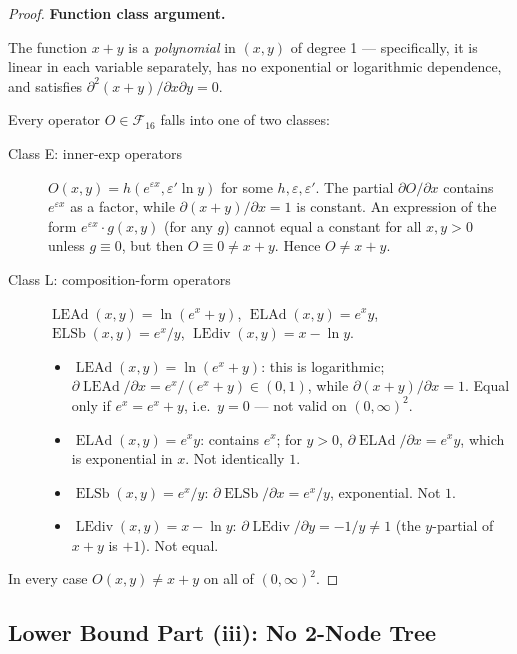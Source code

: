 \documentclass[12pt,a4paper]{article}
\theoremstyle{definition}
\newcommand{\ELAd}{\operatorname{ELAd}}
\newcommand{\ELSb}{\operatorname{ELSb}}
\newcommand{\LEAd}{\operatorname{LEAd}}
\newcommand{\LEdiv}{\operatorname{LEdiv}}
\newcommand{\F}{\mathcal{F}_{16}}
\begin{document}
\begin{proof}
\noindent\textbf{Function class argument.}

The function $x+y$ is a \emph{polynomial} in $(x,y)$ of degree 1 --- specifically, it
is linear in each variable separately, has no exponential or logarithmic dependence,
and satisfies $\partial^2(x+y)/\partial x\partial y = 0$.

Every operator $O\in\F$ falls into one of two classes:
\begin{description}
  \item[Class E: inner-exp operators]
        $O(x,y) = h(e^{\varepsilon x}, \varepsilon'\ln y)$ for some $h, \varepsilon, \varepsilon'$.
        The partial $\partial O/\partial x$ contains $e^{\varepsilon x}$ as a factor,
        while $\partial(x+y)/\partial x = 1$ is constant.
        An expression of the form $e^{\varepsilon x}\cdot g(x,y)$ (for any $g$) cannot
        equal a constant for all $x,y>0$ unless $g\equiv 0$,
        but then $O\equiv 0\neq x+y$.
        Hence $O\neq x+y$.

  \item[Class L: composition-form operators]
        $\LEAd(x,y)=\ln(e^x+y)$, $\ELAd(x,y)=e^x y$, $\ELSb(x,y)=e^x/y$,
        $\LEdiv(x,y)=x-\ln y$.
        \begin{itemize}
          \item $\LEAd(x,y)=\ln(e^x+y)$: this is logarithmic; $\partial\LEAd/\partial x = e^x/(e^x+y) \in (0,1)$,
                while $\partial(x+y)/\partial x = 1$.  Equal only if $e^x=e^x+y$, i.e.\ $y=0$ --- not
                valid on $(0,\infty)^2$.
          \item $\ELAd(x,y)=e^x y$: contains $e^x$; for $y>0$, $\partial\ELAd/\partial x = e^x y$,
                which is exponential in $x$.  Not identically $1$.
          \item $\ELSb(x,y)=e^x/y$: $\partial\ELSb/\partial x = e^x/y$, exponential.  Not $1$.
          \item $\LEdiv(x,y) = x - \ln y$: $\partial\LEdiv/\partial y = -1/y \neq 1$
                (the $y$-partial of $x+y$ is $+1$).  Not equal.
        \end{itemize}
\end{description}
In every case $O(x,y) \neq x+y$ on all of $(0,\infty)^2$.
\end{proof}

\subsection{Lower Bound Part (iii): No 2-Node Tree}
\end{document}
